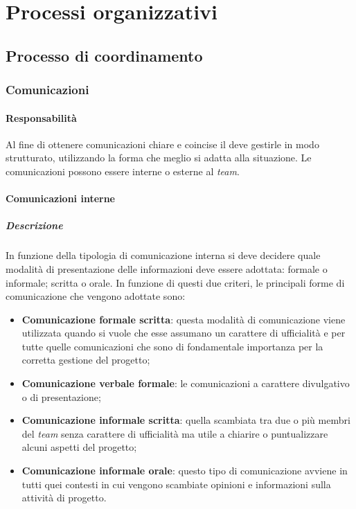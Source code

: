 
\section{Processi organizzativi}

\subsection{Processo di coordinamento}
\subsubsection{Comunicazioni}
\paragraph{Responsabilità}
Al fine di ottenere comunicazioni chiare e coincise il \textit{\RdP} deve gestirle in modo strutturato, utilizzando la forma che meglio si adatta alla situazione.
Le comunicazioni possono essere interne o esterne al \textit{team}.
\paragraph{Comunicazioni interne}
\subparagraph{Descrizione}
In funzione della tipologia di comunicazione interna si deve decidere quale modalità di presentazione delle informazioni deve essere adottata: formale o informale; scritta o orale.
In funzione di questi due criteri, le principali forme di comunicazione che vengono adottate sono:
\begin{itemize}
\item
\textbf{Comunicazione formale scritta}: questa modalità di comunicazione viene utilizzata quando si vuole che esse assumano un carattere di ufficialità e per tutte quelle comunicazioni che sono di fondamentale importanza per la corretta gestione del progetto;
\item
\textbf{Comunicazione verbale formale}: le comunicazioni a carattere divulgativo o di presentazione;
\item
\textbf{Comunicazione informale scritta}: quella scambiata tra due o più membri del \textit{team} senza carattere di ufficialità ma utile a chiarire o puntualizzare alcuni aspetti del progetto;
\item
\textbf{Comunicazione informale orale}: questo tipo di comunicazione avviene in tutti quei contesti in cui vengono scambiate opinioni e informazioni sulla attività di progetto.
\end{itemize}

